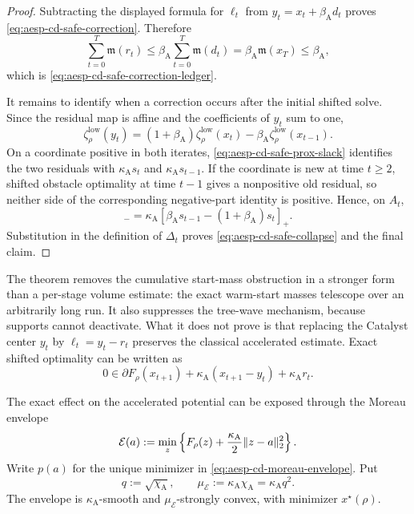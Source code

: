 \begin{proof}
Subtracting the displayed formula for $\ell_t$ from
$y_t=x_t+\beta_{\mathrm A}d_t$ proves
\cref{eq:aesp-cd-safe-correction}.  Therefore
\begin{equation*}
 \sum_{t=0}^T \mathfrak m(r_t)
 \leq\beta_{\mathrm A}\sum_{t=0}^T\mathfrak m(d_t)
 =\beta_{\mathrm A}\mathfrak m(x_T)\leq\beta_{\mathrm A},
\end{equation*}
which is \cref{eq:aesp-cd-safe-correction-ledger}.

It remains to identify when a correction occurs after the initial shifted
solve.  Since the residual map is affine and the coefficients of $y_t$ sum
to one,
\begin{equation*}
 \zeta_\rho^{\mathrm{low}}(y_t)
 =(1+\beta_{\mathrm A})
     \zeta_\rho^{\mathrm{low}}(x_t)
  -\beta_{\mathrm A}
     \zeta_\rho^{\mathrm{low}}(x_{t-1}).
\end{equation*}
On a coordinate positive in both iterates,
\cref{eq:aesp-cd-safe-prox-slack} identifies the two residuals with
$\kappa_{\mathrm A}s_t$ and $\kappa_{\mathrm A}s_{t-1}$.  If the coordinate
is new at time $t\geq2$, shifted obstacle optimality at time $t-1$ gives a
nonpositive old residual, so neither side of the corresponding negative-part
identity is positive.  Hence, on $A_t$,
\begin{equation*}
 [\zeta_\rho^{\mathrm{low}}(y_t)]_-
 =\kappa_{\mathrm A}
   [\beta_{\mathrm A}s_{t-1}
     -(1+\beta_{\mathrm A})s_t]_+.
\end{equation*}
Substitution in the definition of $\Delta_t$ proves
\cref{eq:aesp-cd-safe-collapse} and the final claim.
\end{proof}

The theorem removes the cumulative start-mass obstruction in a stronger
form than a per-stage volume estimate: the exact warm-start masses telescope
over an arbitrarily long run.  It also suppresses the tree-wave mechanism,
because supports cannot deactivate.  What it does not prove is that replacing
the Catalyst center $y_t$ by $\ell_t=y_t-r_t$ preserves the classical
accelerated estimate.  Exact shifted optimality can be written as
\begin{equation}
 0\in\partial F_\rho(x_{t+1})
   +\kappa_{\mathrm A}(x_{t+1}-y_t)
   +\kappa_{\mathrm A}r_t.
 \label{eq:aesp-cd-safe-perturbed-app}
\end{equation}

The exact effect on the accelerated potential can be exposed through the
Moreau envelope
\begin{equation}
 \mathcal E(a):=\min_z\left\{
 F_\rho(z)+\frac{\kappa_{\mathrm A}}2\lVert z-a\rVert_2^2
 \right\}.
 \label{eq:aesp-cd-moreau-envelope}
\end{equation}
Write $p(a)$ for the unique minimizer in
\cref{eq:aesp-cd-moreau-envelope}.  Put
\begin{equation*}
 q:=\sqrt{\chi_{\mathrm A}},
 \qquad
 \mu_{\mathcal E}:=\kappa_{\mathrm A}\chi_{\mathrm A}
                  =\kappa_{\mathrm A}q^2.
\end{equation*}
The envelope is $\kappa_{\mathrm A}$-smooth and
$\mu_{\mathcal E}$-strongly convex, with minimizer $x^\star(\rho)$.

